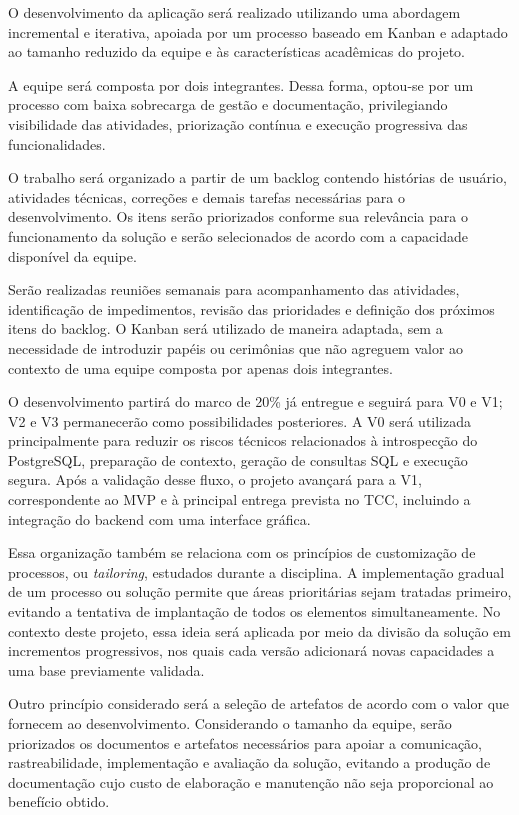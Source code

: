 O desenvolvimento da aplicação será realizado utilizando uma abordagem incremental e iterativa, apoiada por um processo baseado em Kanban e adaptado ao tamanho reduzido da equipe e às características acadêmicas do projeto.

A equipe será composta por dois integrantes. Dessa forma, optou-se por um processo com baixa sobrecarga de gestão e documentação, privilegiando visibilidade das atividades, priorização contínua e execução progressiva das funcionalidades.

O trabalho será organizado a partir de um backlog contendo histórias de usuário, atividades técnicas, correções e demais tarefas necessárias para o desenvolvimento. Os itens serão priorizados conforme sua relevância para o funcionamento da solução e serão selecionados de acordo com a capacidade disponível da equipe.

Serão realizadas reuniões semanais para acompanhamento das atividades, identificação de impedimentos, revisão das prioridades e definição dos próximos itens do backlog. O Kanban será utilizado de maneira adaptada, sem a necessidade de introduzir papéis ou cerimônias que não agreguem valor ao contexto de uma equipe composta por apenas dois integrantes.

O desenvolvimento partirá do marco de 20\% já entregue e seguirá para V0 e V1; V2 e V3 permanecerão como possibilidades posteriores. A V0 será utilizada principalmente para reduzir os riscos técnicos relacionados à introspecção do PostgreSQL, preparação de contexto, geração de consultas SQL e execução segura. Após a validação desse fluxo, o projeto avançará para a V1, correspondente ao MVP e à principal entrega prevista no TCC, incluindo a integração do backend com uma interface gráfica.

Essa organização também se relaciona com os princípios de customização de processos, ou \textit{tailoring}, estudados durante a disciplina. A implementação gradual de um processo ou solução permite que áreas prioritárias sejam tratadas primeiro, evitando a tentativa de implantação de todos os elementos simultaneamente. No contexto deste projeto, essa ideia será aplicada por meio da divisão da solução em incrementos progressivos, nos quais cada versão adicionará novas capacidades a uma base previamente validada.

Outro princípio considerado será a seleção de artefatos de acordo com o valor que fornecem ao desenvolvimento. Considerando o tamanho da equipe, serão priorizados os documentos e artefatos necessários para apoiar a comunicação, rastreabilidade, implementação e avaliação da solução, evitando a produção de documentação cujo custo de elaboração e manutenção não seja proporcional ao benefício obtido.

